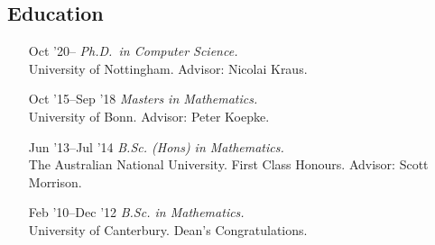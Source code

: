 \documentclass[12pt,a4paper]{article}
\begin{document}
\subsection{Education}

\begin{itemize}[leftmargin=7ex]
\item[\small {\scriptsize Oct} '20--]
  \emph{Ph.D.~in Computer Science.}\\
  University of Nottingham.
  Advisor: Nicolai Kraus.

\item[\small {\scriptsize Oct} '15--{\scriptsize Sep} '18]
  \emph{Masters in Mathematics.}\\
  University of Bonn.
  Advisor: Peter Koepke.

\item[\small {\scriptsize Jun} '13--{\scriptsize Jul} '14]
  \emph{B.Sc. (Hons) in Mathematics.}\\
  The Australian National University.
  First Class Honours.
  Advisor: Scott Morrison.

\item[\small {\scriptsize Feb} '10--{\scriptsize Dec} '12]
  \emph{B.Sc. in Mathematics.}\\
  University of Canterbury.
  Dean's Congratulations.
\end{itemize}
\end{document}
